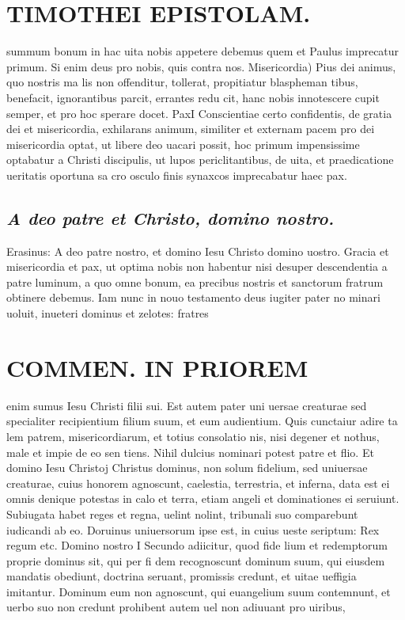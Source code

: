 \documentclass{article}
\begin{document}
\begin{pages}
\section*{TIMOTHEI EPISTOLAM. }
\marginpar{[ p.9 ]}\pstart summum bonum in hac uita nobis appetere debemus quem et Paulus imprecatur primum. Si enim deus pro nobis, quis contra nos.  \pend\pstart Misericordia) Pius dei animus, quo nostris ma lis non offenditur, tollerat, propitiatur blaspheman tibus, benefacit, ignorantibus parcit, errantes redu cit, hanc nobis innotescere cupit semper, et pro hoc sperare docet.  \pend\pstart PaxI Conscientiae certo confidentis, de gratia dei et misericordia, exhilarans animum, similiter et externam pacem pro dei misericordia optat, ut libere deo uacari possit, hoc primum impensissime optabatur a Christi discipulis, ut lupos periclitantibus, de uita, et praedicatione ueritatis oportuna sa cro osculo finis synaxcos imprecabatur haec pax.  \pend
{}
{}
\subsection*{\textit{A deo patre et Christo, domino nostro. }}\pstart Erasinus: A deo patre nostro, et domino Iesu Christo domino uostro.  \pend\pstart Gracia et misericordia et pax, ut optima nobis non habentur nisi desuper descendentia a patre luminum, a quo omne bonum, ea precibus nostris et sanctorum fratrum obtinere debemus.  \pend\pstart Iam nunc in nouo testamento deus iugiter pater no minari uoluit, inueteri dominus et zelotes: fratres  \pend
\section*{COMMEN. IN PRIOREM }
\marginpar{[ p.10 ]}\pstart enim sumus Iesu Christi filii sui. Est autem pater uni uersae creaturae sed specialiter recipientium filium suum, et eum audientium. Quis cunctaiur adire ta lem patrem, misericordiarum, et totius consolatio nis, nisi degener et nothus, male et impie de eo sen tiens. Nihil dulcius nominari potest patre et flio.  \pend\pstart Et domino Iesu Christoj Christus dominus, non solum fidelium, sed uniuersae creaturae, cuius honorem agnoscunt, caelestia, terrestria, et inferna, data est ei omnis denique potestas in calo et terra, etiam angeli et dominationes ei seruiunt. Subiugata habet reges et regna, uelint nolint, tribunali suo comparebunt iudicandi ab eo. Doruinus uniuersorum ipse est, in cuius ueste seriptum: Rex regum etc.  \pend\pstart Domino nostro I Secundo adiicitur, quod fide lium et redemptorum proprie dominus sit, qui per fi dem recognoscunt dominum suum, qui eiusdem mandatis obediunt, doctrina seruant, promissis credunt, et uitae ueffigia imitantur. Dominum eum non agnoscunt, qui euangelium suum contemnunt, et uerbo suo non credunt prohibent autem uel non adiuuant pro uiribus,  \pend
{}
{}

\end{pages}
\end{document}
